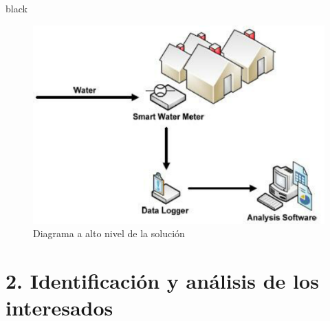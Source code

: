 \documentclass[
11pt, %
codirector, %
]{charter}
\begin{document}
\begin{consigna}{black}
\begin{figure}[htpb]
\centering 
\includegraphics[width=.8\textwidth]{./Figuras/diagHLSolucion.png} 
\caption{Diagrama a alto nivel de la solución}
\label{fig:diagHLSolucion}
\end{figure}

\vspace{25px}

\end{consigna}


\section{2. Identificación y análisis de los interesados}
\label{sec:interesados}
\end{document}
